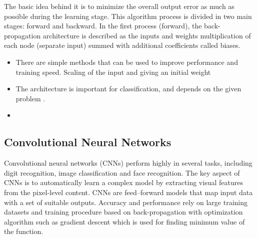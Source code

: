 The basic idea behind it is to minimize the overall output error as much as possible during the learning stage. This algorithm process is divided in two main stages: forward and backward. In the first process (forward), the back-propagation architecture is described as  the inputs and weights multiplication of each node (separate input) summed with additional coefficients called biases.\citep{Hameed2016} 

\begin{itemize}
\item There are simple methods that can be used to improve performance and training speed. Scaling of the input and giving an initial weight \citep{Duda2000}

\item The architecture is important for classification, and depends on the given problem \citep{Duda2000}. 
\item  
\end{itemize}


\subsection{Convolutional Neural Networks}
Convolutional neural networks (CNNs) perform highly in several tasks, including digit recognition, image classification and face recognition. The key aspect of CNNs is to automatically learn a complex model by extracting visual features from the pixel-level content.
CNNs are feed–forward models that map input data with a set of suitable outputs. 
Accuracy and performance rely on large training datasets and training procedure based on back-propagation with optimization algorithm such as gradient descent which is used for finding minimum value of the function.\citep{Acquarelli2017}




